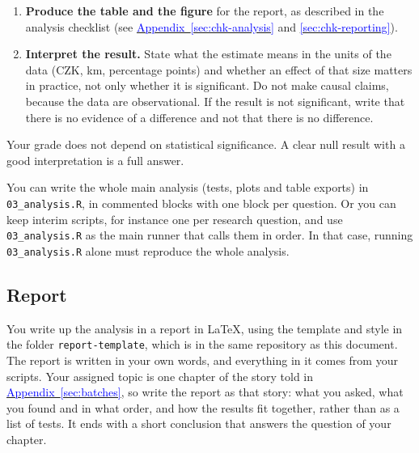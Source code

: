 \documentclass[11pt,a4paper]{article}
\begin{document}
\begin{enumerate}
	\item \textbf{Produce the table and the figure} for the report, as described in the analysis checklist (see \hyperref[sec:chk-analysis]{\textcolor{blue}{Appendix~\ref*{sec:chk-analysis}}} and \hyperref[sec:chk-reporting]{\textcolor{blue}{\ref*{sec:chk-reporting}}}).
	\item \textbf{Interpret the result.} State what the estimate means in the units of the data (CZK, km, percentage points) and whether an effect of that size matters in practice, not only whether it is significant. Do not make causal claims, because the data are observational. If the result is not significant, write that there is no evidence of a difference and not that there is no difference.
\end{enumerate}

Your grade does not depend on statistical significance. A clear null result with a good interpretation is a full answer.

You can write the whole main analysis (tests, plots and table exports) in \texttt{03\_analysis.R}, in commented blocks with one block per question. Or you can keep interim scripts, for instance one per research question, and use \texttt{03\_analysis.R} as the main runner that calls them in order. In that case, running \texttt{03\_analysis.R} alone must reproduce the whole analysis.

\subsection{Report}\label{sec:report}

You write up the analysis in a report in \LaTeX, using the template and style in the folder \texttt{report-template}, which is in the same repository as this document. The report is written in your own words, and everything in it comes from your scripts. Your assigned topic is one chapter of the story told in \hyperref[sec:batches]{\textcolor{blue}{Appendix~\ref*{sec:batches}}}, so write the report as that story: what you asked, what you found and in what order, and how the results fit together, rather than as a list of tests. It ends with a short conclusion that answers the question of your chapter.
\end{document}
